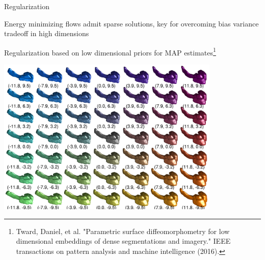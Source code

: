 \documentclass{beamer}
\begin{document}
\begin{frame}{Regularization}

Energy minimizing flows admit sparse solutions, key for overcoming bias variance tradeoff in high dimensions%

\vspace{0.25em}
Regularization based on low dimensional priors for MAP estimates\footnote{Tward, Daniel, et al. "Parametric surface diffeomorphometry for low dimensional embeddings of dense segmentations and imagery." IEEE transactions on pattern analysis and machine intelligence (2016).}
\vspace{-1.5em}
\begin{center}
\includegraphics[width=0.8\textwidth]{Array.png}%
\end{center}
\end{frame}
\end{document}
